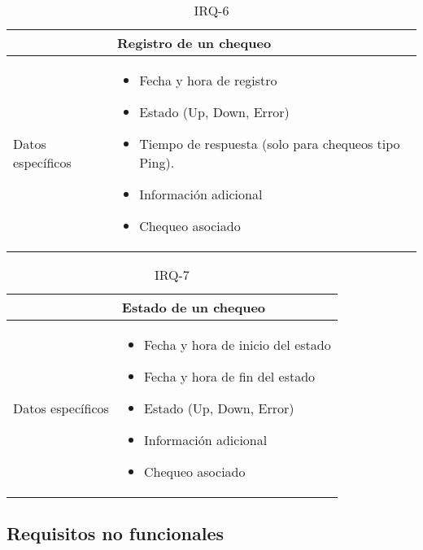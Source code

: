 \begin{table}[h!]
  \centering
  \begin{tabularx}{\textwidth}{|l|X|}
    \hline

    & Registro de un chequeo \\

    \hline
    Datos específicos &

    \begin{itemize}
    \item Fecha y hora de registro
    \item Estado (Up, Down, Error)
    \item Tiempo de respuesta (solo para chequeos tipo Ping).
    \item Información adicional
    \item Chequeo asociado
    \end{itemize}
    \\
    
    \hline
    
  \end{tabularx}
  \caption{IRQ-6}
\end{table}

\begin{table}[h!]
  \centering
  \begin{tabularx}{\textwidth}{|l|X|}
    \hline

    & Estado de un chequeo \\

    \hline
    Datos específicos &

    \begin{itemize}
    \item Fecha y hora de inicio del estado
    \item Fecha y hora de fin del estado
    \item Estado (Up, Down, Error)
    \item Información adicional
    \item Chequeo asociado
    \end{itemize}
    \\
    
    \hline
    
  \end{tabularx}
  \caption{IRQ-7}
\end{table}


\FloatBarrier
\subsection{Requisitos no funcionales}

